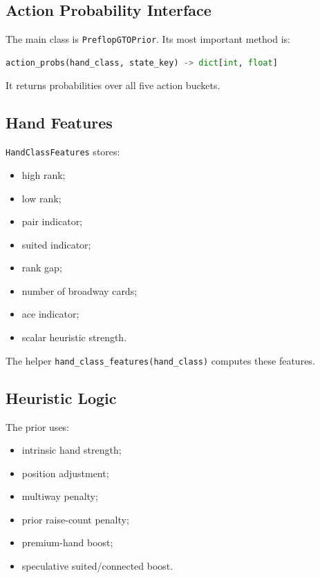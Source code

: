 \documentclass[11pt]{article}
\begin{document}
\subsection{Action Probability Interface}

The main class is \texttt{PreflopGTOPrior}. Its most important method is:

\begin{lstlisting}[language=Python]
action_probs(hand_class, state_key) -> dict[int, float]
\end{lstlisting}

It returns probabilities over all five action buckets.

\subsection{Hand Features}

\texttt{HandClassFeatures} stores:

\begin{itemize}[leftmargin=*]
  \item high rank;
  \item low rank;
  \item pair indicator;
  \item suited indicator;
  \item rank gap;
  \item number of broadway cards;
  \item ace indicator;
  \item scalar heuristic strength.
\end{itemize}

The helper \texttt{hand\_class\_features(hand\_class)} computes these features.

\subsection{Heuristic Logic}

The prior uses:

\begin{itemize}[leftmargin=*]
  \item intrinsic hand strength;
  \item position adjustment;
  \item multiway penalty;
  \item prior raise-count penalty;
  \item premium-hand boost;
  \item speculative suited/connected boost.
\end{itemize}
\end{document}
